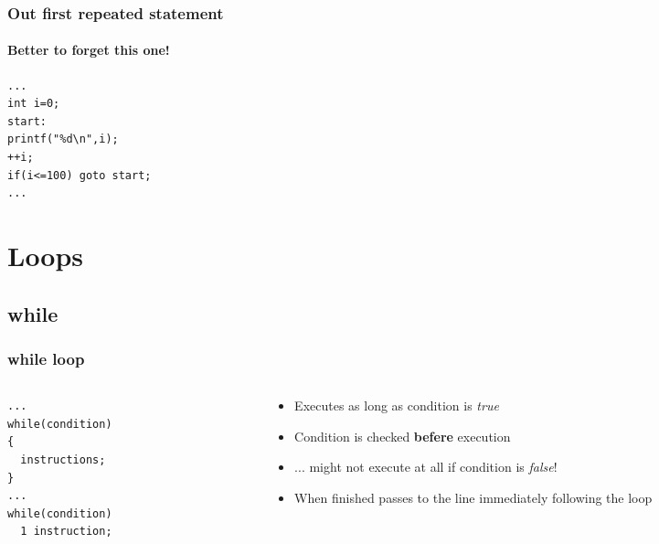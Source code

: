\documentclass[10pt]{beamer}
\begin{document}
\begin{frame}[fragile]
\end{frame}

\begin{frame}[fragile]
  \frametitle{Out first repeated statement}
  \framesubtitle{Better to forget this one!}
  \centering

\begin{lstlisting}
...
int i=0;
start:
printf("%d\n",i);
++i;
if(i<=100) goto start;
...
\end{lstlisting}

\end{frame}

\section{Loops}
\subsection{while}

\begin{frame}[fragile]
  \frametitle{while loop}
  \begin{columns}
    \begin{column}{0.6\textwidth}
\begin{lstlisting}
...
while(condition)
{
  instructions;
}
...
while(condition)
  1 instruction;

\end{lstlisting}
    \end{column}
    \begin{column}{0.5\textwidth}
    \begin{itemize}
      \item Executes as long as condition is \textit{true}
      \item Condition is checked \textbf{befere} execution
      \item ... might not execute at all if condition is \textit{false}!
      \item When finished passes to the line immediately following the loop
    \end{itemize}
    \end{column}
  \end{columns}
\end{frame}
\end{document}
